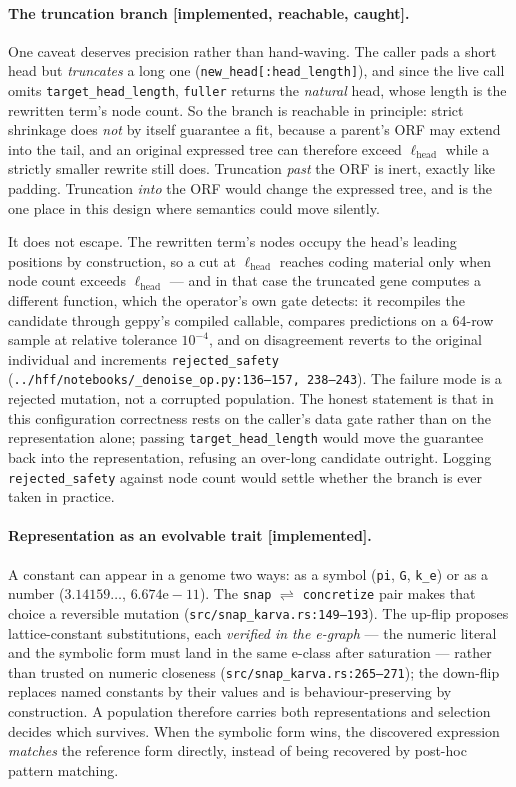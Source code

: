 \documentclass[sigconf]{acmart}
\begin{document}
\paragraph{The truncation branch [implemented, reachable, caught].} One caveat
deserves precision rather than hand-waving. The caller pads a short head but
\emph{truncates} a long one (\texttt{new\_head[:head\_length]}), and since the
live call omits \texttt{target\_head\_length}, \texttt{fuller} returns the
\emph{natural} head, whose length is the rewritten term's node count. So the
branch is reachable in principle: strict shrinkage does \emph{not} by itself
guarantee a fit, because a parent's ORF may extend into the tail, and an original
expressed tree can therefore exceed $\ell_{\text{head}}$ while a strictly smaller
rewrite still does. Truncation \emph{past} the ORF is inert, exactly like padding.
Truncation \emph{into} the ORF would change the expressed tree, and is the one
place in this design where semantics could move silently.

It does not escape. The rewritten term's nodes occupy the head's leading positions
by construction, so a cut at $\ell_{\text{head}}$ reaches coding material only
when node count exceeds $\ell_{\text{head}}$ --- and in that case the truncated
gene computes a different function, which the operator's own gate detects: it
recompiles the candidate through geppy's compiled callable, compares predictions
on a 64-row sample at relative tolerance $10^{-4}$, and on disagreement reverts to
the original individual and increments \texttt{rejected\_safety}
(\texttt{../hff/notebooks/\_denoise\_op.py:136--157, 238--243}). The failure mode
is a rejected mutation, not a corrupted population. The honest statement is that
in this configuration correctness rests on the caller's data gate rather than on
the representation alone; passing \texttt{target\_head\_length} would move the
guarantee back into the representation, refusing an over-long candidate outright.
Logging \texttt{rejected\_safety} against node count would settle whether the
branch is ever taken in practice.

\paragraph{Representation as an evolvable trait [implemented].} A constant can
appear in a genome two ways: as a symbol (\texttt{pi}, \texttt{G},
\texttt{k\_e}) or as a number ($3.14159\ldots$, $6.674\mathrm{e}{-}11$). The
\texttt{snap} $\rightleftharpoons$ \texttt{concretize} pair makes that choice a
reversible mutation (\texttt{src/snap\_karva.rs:149--193}). The up-flip proposes
lattice-constant substitutions, each \emph{verified in the e-graph} --- the
numeric literal and the symbolic form must land in the same e-class after
saturation --- rather than trusted on numeric closeness
(\texttt{src/snap\_karva.rs:265--271}); the down-flip replaces named constants by
their values and is behaviour-preserving by construction. A population therefore
carries both representations and selection decides which survives. When the
symbolic form wins, the discovered expression \emph{matches} the reference form
directly, instead of being recovered by post-hoc pattern matching.
\end{document}
